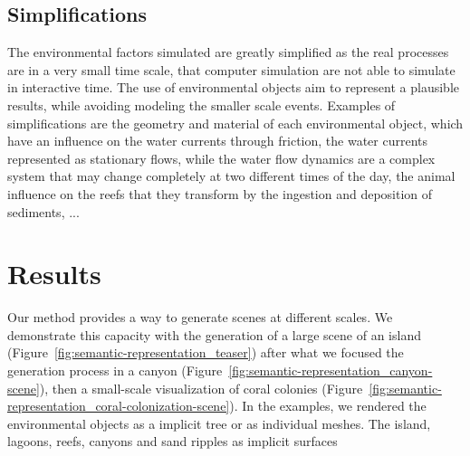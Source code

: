 \subsection{Simplifications}
\label{sec:semantic-representation_simplifications}
The environmental factors simulated are greatly simplified as the real processes are in a very small time scale, that computer simulation are not able to simulate in interactive time. The use of environmental objects aim to represent a plausible results, while avoiding modeling the smaller scale events. Examples of simplifications are the geometry and material of each environmental object, which have an influence on the water currents through friction, the water currents represented as stationary flows, while the water flow dynamics are a complex system that may change completely at two different times of the day, the animal influence on the reefs that they transform by the ingestion and deposition of sediments, ...


\section{Results}
\label{sec:semantic-representation_results}
Our method provides a way to generate scenes at different scales. We demonstrate this capacity with the generation of a large scene of an island (Figure~\ref{fig:semantic-representation_teaser}) after what we focused the generation process in a canyon (Figure~\ref{fig:semantic-representation_canyon-scene}), then a small-scale visualization of coral colonies (Figure~\ref{fig:semantic-representation_coral-colonization-scene}).
In the examples, we rendered the environmental objects as a implicit tree or as individual meshes. The island, lagoons, reefs, canyons and sand ripples as implicit surfaces

